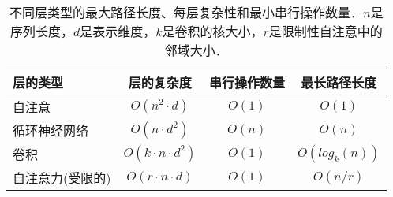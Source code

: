 \begin{table}[t]
\caption{
  不同层类型的最大路径长度、每层复杂性和最小串行操作数量．$n$是序列长度，$d$是表示维度，$k$是卷积的核大小，$r$是限制性自注意中的邻域大小．}
\label{tab:op_complexities}
\begin{center}
\vspace{-1mm}

\begin{tabular}{lccc}
\toprule
层的类型 & 层的复杂度 & 串行操作数量 &  最长路径长度  \\
\hline
\rule{0pt}{2.0ex}自注意 & $O(n^2 \cdot d)$ & $O(1)$ & $O(1)$ \\
循环神经网络 & $O(n \cdot d^2)$ & $O(n)$ & $O(n)$ \\

卷积 & $O(k \cdot n \cdot d^2)$ & $O(1)$ & $O(log_k(n))$ \\
自注意力(受限的)& $O(r \cdot n \cdot d)$ & $O(1)$ & $O(n/r)$ \\





\bottomrule
\end{tabular}
\end{center}
\end{table}


